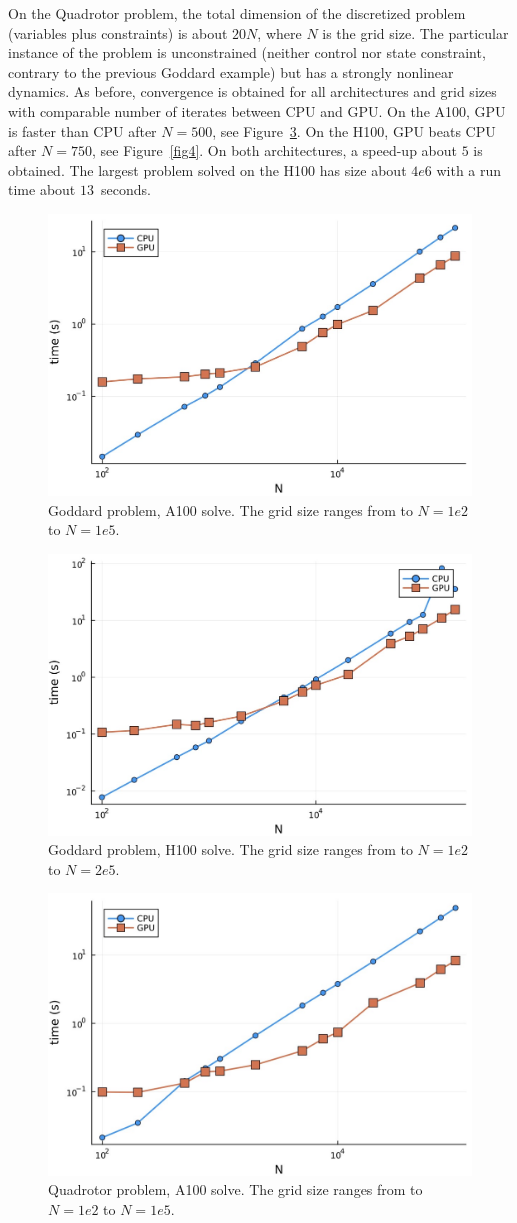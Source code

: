 On the Quadrotor problem, the total dimension of the discretized problem (variables plus constraints) is about $20 N$, where $N$ is the grid size.
The particular instance of the problem is unconstrained (neither control nor state
constraint, contrary to the previous Goddard example) but has a strongly nonlinear dynamics. 
As before, convergence is obtained for all architectures and grid sizes
with comparable number of iterates between CPU and GPU.
On the A100, GPU is faster than CPU after $N = 500$, see Figure~\ref{fig2}.
On the H100, GPU beats CPU after $N = 750$, see Figure~\ref{fig4}.
On both architectures, a speed-up about $5$ is obtained.
The largest problem solved on the H100 has size about $4e6$ with a run time about $13$~seconds.

\begin{figure}
\includegraphics[width=.45\textwidth]{goddard-a100.jpg}
\caption{Goddard problem, A100 solve. The grid size ranges from to $N = 1e2$ to $N = 1e5$.}
\label{fig1}
\end{figure}

 \begin{figure}
\includegraphics[width=.45\textwidth]{goddard-h100.jpg}
\caption{Goddard problem, H100 solve. The grid size ranges from to $N = 1e2$ to $N = 2e5$.}
\label{fig3}
\end{figure}
 
\begin{figure}
\includegraphics[width=.45\textwidth]{quadrotor-a100.jpg}
\caption{Quadrotor problem, A100 solve. The grid size ranges from to $N = 1e2$ to $N = 1e5$.}
\label{fig2}
\end{figure}

